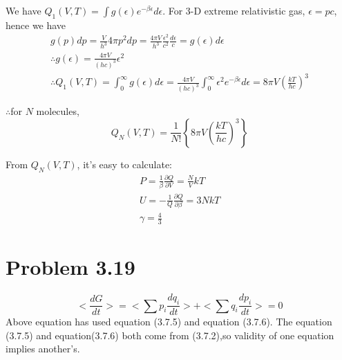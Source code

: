\documentclass{article}
\begin{document}
	We have $Q_1(V,T)=\int g(\epsilon) e^{-\beta \epsilon}d \epsilon $. For 3-D extreme relativistic gas, $\epsilon =pc $, hence we have
	\begin{gather*}
		g(p)dp=\frac{V}{h^3}4 \pi p^2dp = \frac{4 \pi V }{h^3} \frac{\epsilon^2}{c^2} \frac{d \epsilon}{c} = g(\epsilon)d \epsilon\\
		\therefore g(\epsilon)=\frac{4 \pi V}{(hc)^3} \epsilon^2\\
		\therefore Q_1(V,T)=\int^{\infty}_0 g(\epsilon)d \epsilon=\frac{4 \pi V}{(hc)^3} \int^{\infty}_0 \epsilon^2 e^{-\beta \epsilon}d \epsilon = 8 \pi V \left( \frac{kT}{hc} \right)^3
	\end{gather*}
	
	$\therefore$for $N$ molecules,
	\begin{equation*}
		Q_N(V,T)= \frac{1}{N!}\left\{ 8 \pi V \left( \frac{kT}{hc} \right)^3\right\}
	\end{equation*}

	From $Q_N(V,T)$, it's easy to calculate:
	\begin{gather*}
		P=\frac{1}{\beta} \frac{\partial Q}{\partial V} = \frac{N}{V}kT\\
		U = -\frac{1}{Q} \frac{\partial Q}{\partial \beta}=3NkT\\
		\gamma = \frac{4}{3}
	\end{gather*}


\section*{Problem 3.19}
	\begin{equation*}
		<\frac{dG}{dt}>=<\sum p_i \frac{dq_i}{dt}>+<\sum q_i \frac{dp_i}{dt}>=0
	\end{equation*}
	Above equation has used equation (3.7.5) and equation (3.7.6).
	The equation (3.7.5) and equation(3.7.6)  both come from (3.7.2),so validity of one equation implies another's.
	
\end{document}

